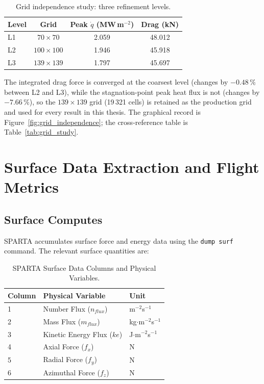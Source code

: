 \begin{table}[H]
    \centering
    \caption{Grid independence study: three refinement levels.}
    \label{tab:mesh_independence}
    \begin{tabular}{|l|c|c|c|}
        \hline
        \textbf{Level} & \textbf{Grid} & \textbf{Peak $\dot q$ (MW\,m$^{-2}$)} & \textbf{Drag (kN)} \\ \hline
        L1 & $70\times70$ & 2.059 & 48.012 \\ \hline
        L2 & $100\times100$ & 1.946 & 45.918 \\ \hline
        L3 & $139\times139$ & 1.797 & 45.697 \\ \hline
    \end{tabular}
\end{table}

The integrated drag force is converged at the coarsest level (changes by $-0.48\,\%$ between L2 and L3), while the stagnation-point peak heat flux is not (changes by $-7.66\,\%$), so the $139\times139$ grid (19\,321 cells) is retained as the production grid and used for every result in this thesis. The graphical record is Figure~\ref{fig:grid_independence}; the cross-reference table is Table~\ref{tab:grid_study}.

\section{Surface Data Extraction and Flight Metrics}

\subsection{Surface Computes}
SPARTA accumulates surface force and energy data using the \texttt{dump surf} command. The relevant surface quantities are:

\begin{table}[H]
    \centering
    \caption{SPARTA Surface Data Columns and Physical Variables.}
    \label{tab:surface_data}
    \begin{tabular}{|l|l|l|}
        \hline
        \textbf{Column} & \textbf{Physical Variable} & \textbf{Unit} \\ \hline
        1 & Number Flux ($n_{flux}$) & m$^{-2}$s$^{-1}$ \\ \hline
        2 & Mass Flux ($m_{flux}$) & kg$\cdot$m$^{-2}$s$^{-1}$ \\ \hline
        3 & Kinetic Energy Flux ($ke$) & J$\cdot$m$^{-2}$s$^{-1}$ \\ \hline
        4 & Axial Force ($f_x$) & N \\ \hline
        5 & Radial Force ($f_y$) & N \\ \hline
        6 & Azimuthal Force ($f_z$) & N \\ \hline
    \end{tabular}
\end{table}

